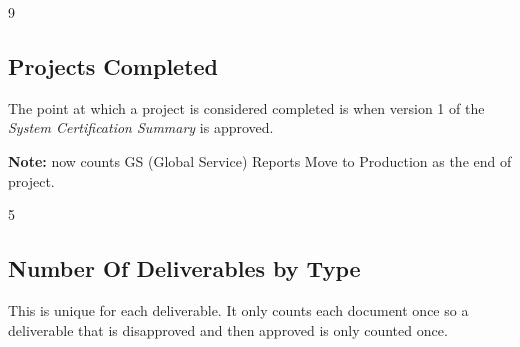\documentclass{article}
\begin{document}
\begin{Schunk}
\begin{Soutput}
[1] 9
\end{Soutput}
\end{Schunk}

\subsection{Projects Completed}

The point at which a project is considered completed is when version 1 of the
\textit{System Certification Summary} is approved.

\textbf{Note:} now counts GS (Global Service) Reports Move to Production as the end
of project.

\begin{Schunk}
\begin{Soutput}
[1] 5
\end{Soutput}
\end{Schunk}


\subsection{Number Of Deliverables by Type}
This is unique for each deliverable. It only counts each document once so a deliverable
that is disapproved and then approved is only counted once.
\end{document}
